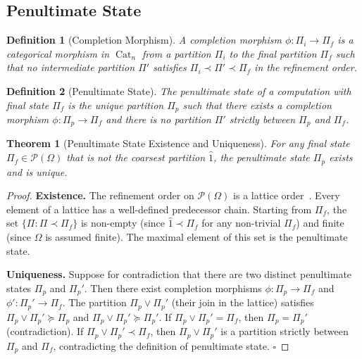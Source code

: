 \documentclass[12pt,twocolumn]{article}
\newtheorem{theorem}{Theorem}[section]
\newtheorem{definition}{Definition}[section]
\DeclareMathOperator{\Cat}{Cat}
\begin{document}
\subsection{Penultimate State}
\label{sec:penultimate}

\begin{definition}[Completion Morphism]
A \emph{completion morphism} $\phi: \Pi_i \to \Pi_f$ is a categorical morphism in $\Cat_n$ from a partition $\Pi_i$ to the final partition $\Pi_f$ such that no intermediate partition $\Pi'$ satisfies $\Pi_i \prec \Pi' \prec \Pi_f$ in the refinement order.
\end{definition}

\begin{definition}[Penultimate State]
The \emph{penultimate state} of a computation with final state $\Pi_f$ is the unique partition $\Pi_p$ such that there exists a completion morphism $\phi: \Pi_p \to \Pi_f$ and there is no partition $\Pi'$ strictly between $\Pi_p$ and $\Pi_f$.
\end{definition}

\begin{theorem}[Penultimate State Existence and Uniqueness]
\label{thm:penultimate}
For any final state $\Pi_f \in \mathcal{P}(\Omega)$ that is not the coarsest partition $\hat{1}$, the penultimate state $\Pi_p$ exists and is unique.
\end{theorem}

\begin{proof}
\textbf{Existence.} The refinement order on $\mathcal{P}(\Omega)$ is a lattice order~\cite{lawvere2003sets}. Every element of a lattice has a well-defined predecessor chain. Starting from $\Pi_f$, the set $\{\Pi : \Pi \prec \Pi_f\}$ is non-empty (since $\hat{1} \prec \Pi_f$ for any non-trivial $\Pi_f$) and finite (since $\Omega$ is assumed finite). The maximal element of this set is the penultimate state.

\textbf{Uniqueness.} Suppose for contradiction that there are two distinct penultimate states $\Pi_p$ and $\Pi_p'$. Then there exist completion morphisms $\phi: \Pi_p \to \Pi_f$ and $\phi': \Pi_p' \to \Pi_f$. The partition $\Pi_p \vee \Pi_p'$ (their join in the lattice) satisfies $\Pi_p \vee \Pi_p' \succeq \Pi_p$ and $\Pi_p \vee \Pi_p' \succeq \Pi_p'$. If $\Pi_p \vee \Pi_p' = \Pi_f$, then $\Pi_p = \Pi_p'$ (contradiction). If $\Pi_p \vee \Pi_p' \prec \Pi_f$, then $\Pi_p \vee \Pi_p'$ is a partition strictly between $\Pi_p$ and $\Pi_f$, contradicting the definition of penultimate state. $\square$
\end{proof}
\end{document}
